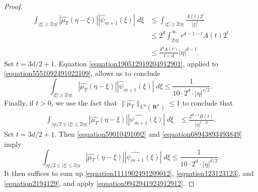 \documentclass[12pt,reqno]{article}
\numberwithin{equation}{section}
\DeclareMathOperator{\RR}{\mathbf{R}}
\begin{document}
\begin{proof}
\begin{equation}
    \begin{split}
        \int_{|\xi| \geq 2|\eta|} |\widehat{\mu_T}(\eta - \xi)| |\widehat{\psi}_{m+1}(\xi)|\; d\xi &\leq \int_{|\xi| \geq 2|\eta|} \frac{A(t) 2^t}{|\xi|^t}\\
        &\leq 2^d \int_{2|\eta|}^\infty r^{d-1 - t} A(t) 2^t\\
        &\leq \frac{4^d A(t)}{t - d} |\eta|^{d-t}.
    \end{split}
    \end{equation}
    Set $t = 3d/2 + 1$. Equation \eqref{equation190512919204912901}, applied to \eqref{equation5551092491022109}, allows us to conclude
    \begin{equation} \label{equation123123123}
        \int_{|\xi| \geq 2|\eta|} |\widehat{\mu_T}(\eta - \xi)| |\widehat{\psi}_{m+1}(\xi)|\; d\xi \leq \frac{1}{10 \cdot 2^d \cdot |\eta|^{s/2}}.
    \end{equation}
    Finally, if $t > 0$, we use the fact that $\| \widehat{\mu_T} \|_{L^\infty(\RR^d)} \leq 1$ to conclude that
    \begin{equation} \label{equation59010491092}
    \begin{split}
        \int_{|\eta|/2 \leq |\xi| \leq 2|\eta|} |\widehat{\mu_T}(\eta - \xi)| |\widehat{\psi_{m+1}}(\xi)|\; d\xi &\leq \frac{2^{d+t} B(t)}{|\eta|^{t-d}}.
    \end{split}
    \end{equation}
    Set $t = 3d/2 + 1$. Then \eqref{equation59010491092} and \eqref{equation68943893493849} imply
    \begin{equation} \label{equation2194129}
        \int_{|\eta|/2 \leq |\xi| \leq 2|\eta} |\widehat{\mu_T}(\eta - \xi)| |\widehat{\psi_{m+1}}(\xi)|\; d\xi \leq \frac{1}{10 \cdot 2^d \cdot |\eta|^{d/2}}.
    \end{equation}
    It then suffices to sum up \eqref{equation1111902491209012}, \eqref{equation123123123}, and \eqref{equation2194129}, and apply \eqref{equation9942941924912912}.
\end{proof}
\end{document}

